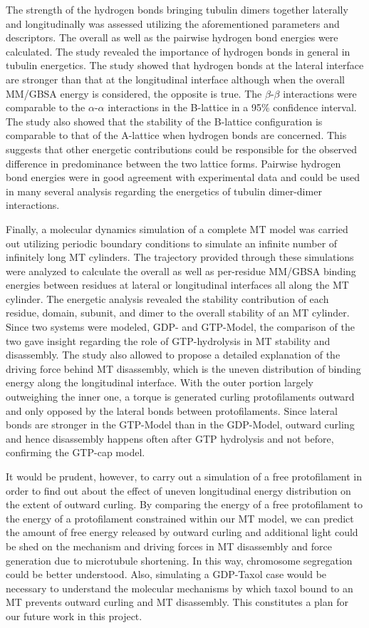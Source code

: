 \documentclass[11pt]{report}
\begin{document}
The strength of the hydrogen bonds bringing tubulin dimers together laterally and
longitudinally was assessed utilizing the aforementioned parameters and descriptors.
The overall as well as the pairwise hydrogen bond energies were calculated.
The study revealed the importance of hydrogen bonds in general in tubulin
energetics. The study showed that hydrogen bonds at the lateral interface 
are stronger than that at the longitudinal interface although when the overall MM/GBSA
energy is considered, the opposite is true. The $\beta$-$\beta$ interactions
were comparable to the $\alpha$-$\alpha$ interactions in the B-lattice in a 95\% confidence
interval.
The study also showed that the stability of the B-lattice configuration is comparable to that of
the A-lattice when hydrogen bonds are concerned. This suggests that other energetic contributions
could be responsible for the observed difference in predominance between the two lattice forms.
Pairwise hydrogen bond energies were in good agreement with experimental data and
could be used in many several analysis regarding the energetics of tubulin
dimer-dimer interactions.

Finally, a molecular dynamics simulation of a complete MT model was carried
out utilizing periodic boundary conditions to simulate an infinite number 
of infinitely long MT cylinders. The trajectory provided through these simulations
were analyzed to calculate the overall as well as per-residue MM/GBSA
binding energies between residues at lateral or longitudinal interfaces
all along the MT cylinder.
The energetic analysis revealed the stability contribution of each residue, domain,
subunit, and dimer to the overall stability of an MT cylinder. 
Since two systems were modeled, GDP- and GTP-Model, the comparison of the
two gave insight regarding the role of GTP-hydrolysis in MT stability and
disassembly. The study also allowed to propose a detailed explanation
of the driving force behind MT disassembly, which is the uneven distribution
of binding energy along the longitudinal interface. With the outer portion
largely outweighing the inner one, a torque is generated curling protofilaments
outward and only opposed by the lateral bonds between protofilaments. Since 
lateral bonds are
stronger in the GTP-Model than in the GDP-Model, outward curling and hence
disassembly happens often after GTP hydrolysis and not before, confirming the
GTP-cap model.

It would be prudent, however, to carry out a simulation of a free protofilament
in order to find out about the
effect of uneven longitudinal 
energy distribution on the
extent of outward curling. By comparing
the energy of a free protofilament
to the energy of a protofilament constrained 
within our MT model, we can 
predict the amount of free
energy released by outward curling
and additional light could be shed on the
mechanism and driving forces in MT
disassembly and force generation due to microtubule shortening. In this
way, chromosome segregation could be better understood.
Also, simulating a GDP-Taxol case
would be necessary to understand the molecular mechanisms
by which taxol bound to an MT prevents outward
curling and MT disassembly. This constitutes a plan for our future work
in this project.
\end{document}
